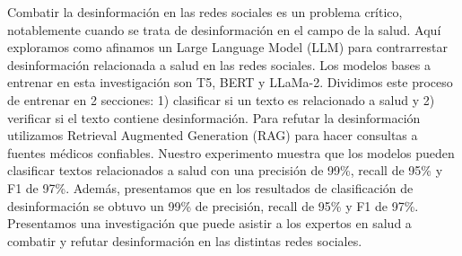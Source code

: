 \noindent
Combatir la desinformaci\'on en las redes sociales es un problema cr\'itico, notablemente cuando se trata de desinformaci\'on en el campo de la salud. Aqu\'i exploramos como afinamos un Large Language Model (LLM) para contrarrestar desinformaci\'on relacionada a salud en las redes sociales. Los modelos bases a entrenar en esta investigaci\'on son T5, BERT y LLaMa-2. Dividimos este proceso de entrenar en 2 secciones: 1) clasificar si un texto es relacionado a salud y 2) verificar si el texto contiene desinformaci\'on. Para refutar la desinformaci\'on utilizamos Retrieval Augmented Generation (RAG) para hacer consultas a fuentes m\'edicos confiables. Nuestro experimento muestra que los modelos pueden clasificar textos relacionados a salud con una precisi\'on de 99\%, recall de 95\% y F1 de 97\%. Adem\'as, presentamos que en los resultados de clasificaci\'on de desinformaci\'on se obtuvo un 99\% de precisi\'on, recall de 95\% y F1 de 97\%. Presentamos una investigaci\'on que puede asistir a los expertos en salud a combatir y refutar desinformaci\'on en las distintas redes sociales.

